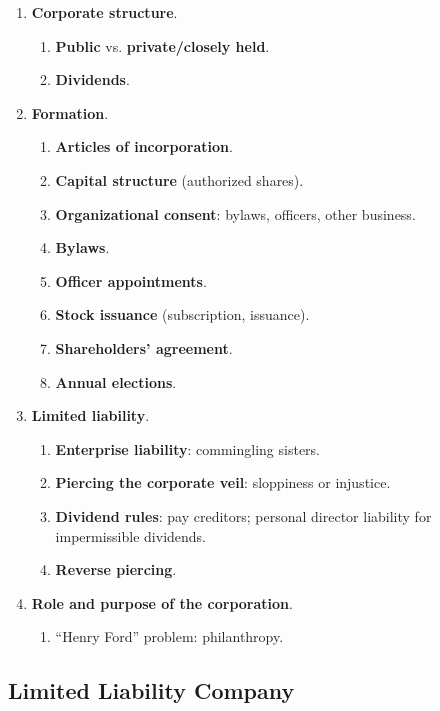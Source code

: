 \begin{enumerate}
    \item \textbf{Corporate structure}.
    \begin{enumerate}
        \item \textbf{Public} vs. \textbf{private/closely held}.
        \item \textbf{Dividends}.
    \end{enumerate}
    \item \textbf{Formation}.
    \begin{enumerate}
        \item \textbf{Articles of incorporation}.
        \item \textbf{Capital structure} (authorized shares).
        \item \textbf{Organizational consent}: bylaws, officers, other 
        business.
        \item \textbf{Bylaws}.
        \item \textbf{Officer appointments}.
        \item \textbf{Stock issuance} (subscription, issuance).
        \item \textbf{Shareholders' agreement}.
        \item \textbf{Annual elections}.
    \end{enumerate}
    \item \textbf{Limited liability}.
    \begin{enumerate}
        \item \textbf{Enterprise liability}: commingling sisters.
        \item \textbf{Piercing the corporate veil}: sloppiness or injustice.
        \item \textbf{Dividend rules}: pay creditors; personal director 
        liability for impermissible dividends.
        \item \textbf{Reverse piercing}.
    \end{enumerate}
    \item \textbf{Role and purpose of the corporation}.
    \begin{enumerate}
        \item ``Henry Ford'' problem: philanthropy.
    \end{enumerate}
\end{enumerate}

\newpage

\subsection{Limited Liability Company}

